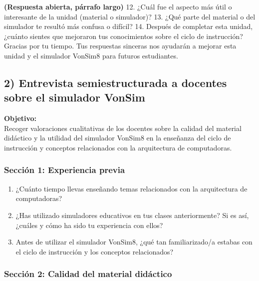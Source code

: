 \documentclass[12pt,oneside]{templates/unerthesis}
\begin{document}
\textbf{(Respuesta abierta, párrafo largo)}
12. ¿Cuál fue el aspecto más útil o interesante de la unidad (material o simulador)?
13. ¿Qué parte del material o del simulador te resultó más confusa o difícil?
14. Después de completar esta unidad, ¿cuánto sientes que mejoraron tus conocimientos sobre el ciclo de instrucción?
Gracias por tu tiempo. Tus respuestas sinceras nos ayudarán a mejorar esta unidad y el simulador VonSim8 para futuros estudiantes.

\hypertarget{entrevista-semiestructurada-a-docentes-sobre-el-simulador-vonsim}{%
\subsection{2) Entrevista semiestructurada a docentes sobre el simulador VonSim}\label{entrevista-semiestructurada-a-docentes-sobre-el-simulador-vonsim}}

\textbf{Objetivo:}\\
Recoger valoraciones cualitativas de los docentes sobre la calidad del material didáctico y la utilidad del simulador VonSim8 en la enseñanza del ciclo de instrucción y conceptos relacionados con la arquitectura de computadoras.

\hypertarget{secciuxf3n-1-experiencia-previa-1}{%
\subsubsection{Sección 1: Experiencia previa}\label{secciuxf3n-1-experiencia-previa-1}}

\begin{enumerate}
\def\labelenumi{\arabic{enumi}.}
\item
  ¿Cuánto tiempo llevas enseñando temas relacionados con la arquitectura de computadoras?
\item
  ¿Has utilizado simuladores educativos en tus clases anteriormente? Si es así, ¿cuáles y cómo ha sido tu experiencia con ellos?
\item
  Antes de utilizar el simulador VonSim8, ¿qué tan familiarizado/a estabas con el ciclo de instrucción y los conceptos relacionados?
\end{enumerate}

\hypertarget{secciuxf3n-2-calidad-del-material-diduxe1ctico-1}{%
\subsubsection{Sección 2: Calidad del material didáctico}\label{secciuxf3n-2-calidad-del-material-diduxe1ctico-1}}
\end{document}
